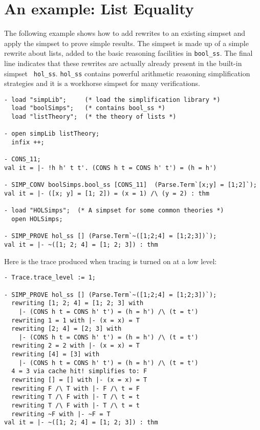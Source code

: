 \documentclass[a4]{article}
\begin{document}
\section{An example: List Equality}

The following example shows how to add rewrites to an existing simpset
and apply the simpset to prove simple results.  The simpset is made up
of a simple rewrite about lists, added to the basic reasoning
facilities in {\tt bool\_ss}.  The final line indicates that these
rewrites are actually already present in the built-in simpset {\tt
hol\_ss}.  {\tt hol\_ss} contains powerful arithmetic reasoning
simplification strategies and it is a workhorse simpset for many
verifications.
\begin{boxed} \begin{verbatim}
- load "simpLib";     (* load the simplification library *)
  load "boolSimps";   (* contains bool_ss *)
  load "listTheory";  (* the theory of lists *)

- open simpLib listTheory;
  infix ++;

- CONS_11;
val it = |- !h h' t t'. (CONS h t = CONS h' t') = (h = h')

- SIMP_CONV boolSimps.bool_ss [CONS_11]  (Parse.Term`[x;y] = [1;2]`);
val it = |- ([x; y] = [1; 2]) = (x = 1) /\ (y = 2) : thm

- load "HOLSimps";  (* A simpset for some common theories *)
  open HOLSimps;

- SIMP_PROVE hol_ss [] (Parse.Term`~([1;2;4] = [1;2;3])`);
val it = |- ~([1; 2; 4] = [1; 2; 3]) : thm
\end{verbatim} \end{boxed}
Here is the trace produced when tracing is turned on at a low level:
\begin{boxed} \begin{verbatim}
- Trace.trace_level := 1;

- SIMP_PROVE hol_ss [] (Parse.Term`~([1;2;4] = [1;2;3])`);
  rewriting [1; 2; 4] = [1; 2; 3] with
    |- (CONS h t = CONS h' t') = (h = h') /\ (t = t')
  rewriting 1 = 1 with |- (x = x) = T
  rewriting [2; 4] = [2; 3] with
    |- (CONS h t = CONS h' t') = (h = h') /\ (t = t')
  rewriting 2 = 2 with |- (x = x) = T
  rewriting [4] = [3] with
    |- (CONS h t = CONS h' t') = (h = h') /\ (t = t')
  4 = 3 via cache hit! simplifies to: F
  rewriting [] = [] with |- (x = x) = T
  rewriting F /\ T with |- F /\ t = F
  rewriting T /\ F with |- T /\ t = t
  rewriting T /\ F with |- T /\ t = t
  rewriting ~F with |- ~F = T
val it = |- ~([1; 2; 4] = [1; 2; 3]) : thm
\end{verbatim} \end{boxed}
\end{document}
